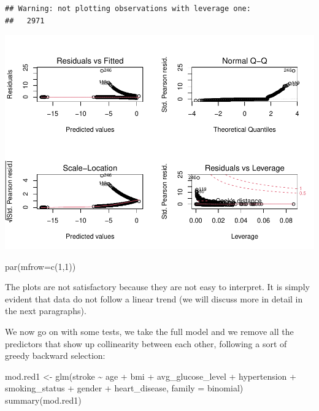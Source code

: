 \documentclass[
]{article}
\newenvironment{Shaded}{\begin{snugshade}}{\end{snugshade}}
\newcommand{\AttributeTok}[1]{\textcolor[rgb]{0.77,0.63,0.00}{#1}}
\newcommand{\DecValTok}[1]{\textcolor[rgb]{0.00,0.00,0.81}{#1}}
\newcommand{\FunctionTok}[1]{\textcolor[rgb]{0.00,0.00,0.00}{#1}}
\newcommand{\NormalTok}[1]{#1}
\newcommand{\OtherTok}[1]{\textcolor[rgb]{0.56,0.35,0.01}{#1}}
\newcommand{\SpecialCharTok}[1]{\textcolor[rgb]{0.00,0.00,0.00}{#1}}
\begin{document}
\begin{verbatim}
## Warning: not plotting observations with leverage one:
##   2971
\end{verbatim}

\includegraphics{stat-project-stroke_files/figure-latex/unnamed-chunk-13-1.pdf}

\begin{Shaded}
\begin{Highlighting}[]
\FunctionTok{par}\NormalTok{(}\AttributeTok{mfrow=}\FunctionTok{c}\NormalTok{(}\DecValTok{1}\NormalTok{,}\DecValTok{1}\NormalTok{))}
\end{Highlighting}
\end{Shaded}

The plots are not satisfactory because they are not easy to interpret.
It is simply evident that data do not follow a linear trend (we will
discuss more in detail in the next paragraphs).

We now go on with some tests, we take the full model and we remove all
the predictors that show up collinearity between each other, following a
sort of greedy backward selection:

\begin{Shaded}
\begin{Highlighting}[]
\NormalTok{mod.red1 }\OtherTok{\textless{}{-}} \FunctionTok{glm}\NormalTok{(stroke }\SpecialCharTok{\textasciitilde{}}\NormalTok{ age }\SpecialCharTok{+}\NormalTok{ bmi }\SpecialCharTok{+}\NormalTok{ avg\_glucose\_level }\SpecialCharTok{+}\NormalTok{ hypertension }\SpecialCharTok{+} 
\NormalTok{                  smoking\_status }\SpecialCharTok{+}\NormalTok{ gender }\SpecialCharTok{+}\NormalTok{ heart\_disease, }\AttributeTok{family =}\NormalTok{ binomial)}
\FunctionTok{summary}\NormalTok{(mod.red1)}
\end{Highlighting}
\end{Shaded}
\end{document}

